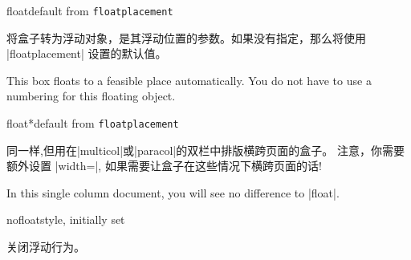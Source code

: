   
  \begin{docTcbKey}{float}{}{default from \texttt{floatplacement}}
  
  将盒子转为浮动对象，是其浮动位置的参数。如果没有指定，那么将使用 |floatplacement| 设置的默认值。
  \begin{dispListing}
  \begin{tcolorbox}[float, title=Floating box from |float|,
      enhanced,watermark text={I'm also floating}]
    This box floats to a feasible place automatically. You do not have to
    use a numbering for this floating object.
  \end{tcolorbox}
  \end{dispListing}
  \end{docTcbKey}
  {\tcbusetemp}
  
  
  \begin{docTcbKey}{float*}{}{default from \texttt{floatplacement}}
  
  同一样,但用在|multicol|或|paracol|的双栏中排版横跨页面的盒子。 
  注意，你需要额外设置 |width=\textwidth|, 如果需要让盒子在这些情况下横跨页面的话!
  \begin{dispListing}
  \begin{tcolorbox}[float*=b, title=Floating box from |float*|,width=\textwidth,
      enhanced,watermark text={I'm also floating}]
    In this single column document, you will see no difference to |float|.
  \end{tcolorbox}
  \end{dispListing}
  \end{docTcbKey}
  {\tcbusetemp}




\begin{docTcbKey}{nofloat}{}{style, initially set}

关闭浮动行为。
\end{docTcbKey}


